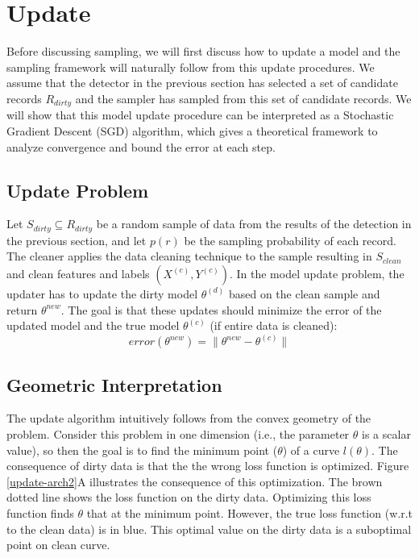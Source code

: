 \section{Update}\label{model-update}
Before discussing sampling, we will first discuss how to update a model and the sampling framework will naturally follow from this update procedures.
We assume that the detector in the previous section has selected 
a set of candidate records $R_{dirty}$ and the sampler has sampled from this
set of candidate records.
We will show that this model update procedure can be interpreted as a Stochastic 
Gradient Descent (SGD) algorithm, which gives a theoretical framework to analyze
convergence and bound the error at each step.

\subsection{Update Problem}
Let $S_{dirty} \subseteq R_{dirty}$  be a random sample of data from the results of the detection in the previous section, and let $p(r)$ be the sampling probability of each record.
The cleaner applies the data cleaning technique to the sample resulting in $S_{clean}$ and clean features and labels $(X^{(c)},Y^{(c)})$. 
In the model update problem, the updater has to update the dirty model $\theta^{(d)}$ based on the clean sample and return $\theta^{new}$.
The goal is that these updates should minimize the error of the updated model and the true model $\theta^{(c)}$ (if entire data is cleaned):
\[
error(\theta^{new}) = \| \theta^{new} - \theta^{(c)} \|
\]

\subsection{Geometric Interpretation}
The update algorithm intuitively follows from the convex geometry of the problem.
Consider this problem in one dimension (i.e., the parameter $\theta$ is a scalar value), so then the goal is to find the minimum point ($\theta$) of a curve $l(\theta)$.
The consequence of dirty data is that the the wrong loss function is optimized.
Figure \ref{update-arch2}A illustrates the consequence of this optimization.
The brown dotted line shows the loss function on the dirty data.
Optimizing this loss function finds $\theta$ that at the minimum point.
However, the true loss function (w.r.t to the clean data) is in blue.
This optimal value on the dirty data is a suboptimal point on clean curve.

